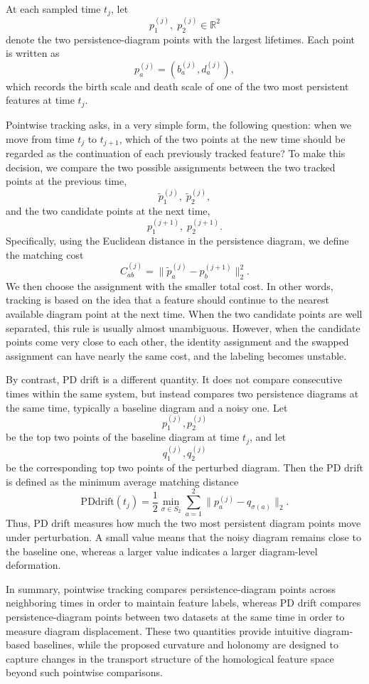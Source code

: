 \documentclass[pdflatex,sn-mathphys-num]{sn-jnl}%
\theoremstyle{thmstyleone}%
\theoremstyle{thmstyletwo}%
\theoremstyle{thmstylethree}%
\begin{document}
At each sampled time \(t_j\), let
\[
p_1^{(j)},\; p_2^{(j)} \in \mathbb{R}^2
\]
denote the two persistence-diagram points with the largest lifetimes. Each point is written as
\[
p_a^{(j)}=(b_a^{(j)},d_a^{(j)}),
\]
which records the birth scale and death scale of one of the two most persistent features at time \(t_j\).

Pointwise tracking asks, in a very simple form, the following question: when we move from time \(t_j\) to \(t_{j+1}\), which of the two points at the new time should be regarded as the continuation of each previously tracked feature? To make this decision, we compare the two possible assignments between the two tracked points at the previous time,
\[
\widetilde p_1^{(j)},\; \widetilde p_2^{(j)},
\]
and the two candidate points at the next time,
\[
p_1^{(j+1)},\; p_2^{(j+1)}.
\]
Specifically, using the Euclidean distance in the persistence diagram, we define the matching cost
\[
C_{ab}^{(j)}=\|\widetilde p_a^{(j)}-p_b^{(j+1)}\|_2^2.
\]
We then choose the assignment with the smaller total cost. In other words, tracking is based on the idea that a feature should continue to the nearest available diagram point at the next time. When the two candidate points are well separated, this rule is usually almost unambiguous. However, when the candidate points come very close to each other, the identity assignment and the swapped assignment can have nearly the same cost, and the labeling becomes unstable.

By contrast, PD drift is a different quantity. It does not compare consecutive times within the same system, but instead compares two persistence diagrams at the same time, typically a baseline diagram and a noisy one. Let
\[
p_1^{(j)},p_2^{(j)}
\]
be the top two points of the baseline diagram at time \(t_j\), and let
\[
q_1^{(j)},q_2^{(j)}
\]
be the corresponding top two points of the perturbed diagram. Then the PD drift is defined as the minimum average matching distance
\[
\mathrm{PDdrift}(t_j)
=
\frac{1}{2}
\min_{\sigma\in S_2}
\sum_{a=1}^2
\|p_a^{(j)}-q_{\sigma(a)}\|_2.
\]
Thus, PD drift measures how much the two most persistent diagram points move under perturbation. A small value means that the noisy diagram remains close to the baseline one, whereas a larger value indicates a larger diagram-level deformation.

In summary, pointwise tracking compares persistence-diagram points across neighboring times in order to maintain feature labels, whereas PD drift compares persistence-diagram points between two datasets at the same time in order to measure diagram displacement. These two quantities provide intuitive diagram-based baselines, while the proposed curvature and holonomy are designed to capture changes in the transport structure of the homological feature space beyond such pointwise comparisons.
\end{document}
